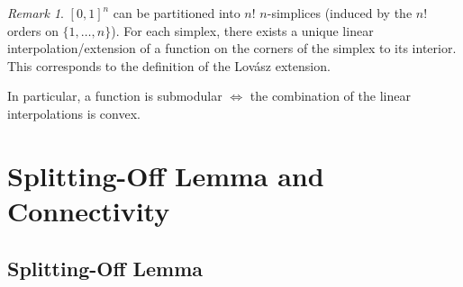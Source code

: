\documentclass[11pt, a4paper]{article}
\newcommand{\set}[1]{\{#1\}}
\theoremstyle{remark}
\newtheorem*{uremark}{Remark}
\theoremstyle{definition}
\begin{document}
\begin{uremark}
	$[0,1]^n$ can be partitioned into $n!$ $n$-simplices (induced by the $n!$
	orders on $\set{1,\ldots,n}$). For each simplex, there exists a unique
	linear interpolation/extension of a function on the corners of the simplex to
	its interior. This corresponds to the definition of the Lovász extension.

	In particular, a function is submodular $\Leftrightarrow$ the
	combination of the linear interpolations is convex.
\end{uremark}

\section{Splitting-Off Lemma and Connectivity}
\subsection{Splitting-Off Lemma}
\end{document}
